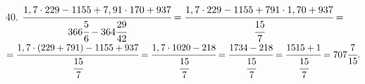 40. $\cfrac{1,7\cdot229-1155+7,91\cdot170+937}{366\cfrac{5}{6}-364\cfrac{29}{42}}=\cfrac{1,7\cdot229-1155+791\cdot1,70+937}{\cfrac{15}{7}}=$\\$=
\cfrac{1,7\cdot(229+791)-1155+937}{\cfrac{15}{7}}=\cfrac{1,7\cdot1020-218}{\cfrac{15}{7}}=\cfrac{1734-218}{\cfrac{15}{7}}=
\cfrac{1515+1}{\cfrac{15}{7}}=707\cfrac{7}{15}.$\\
